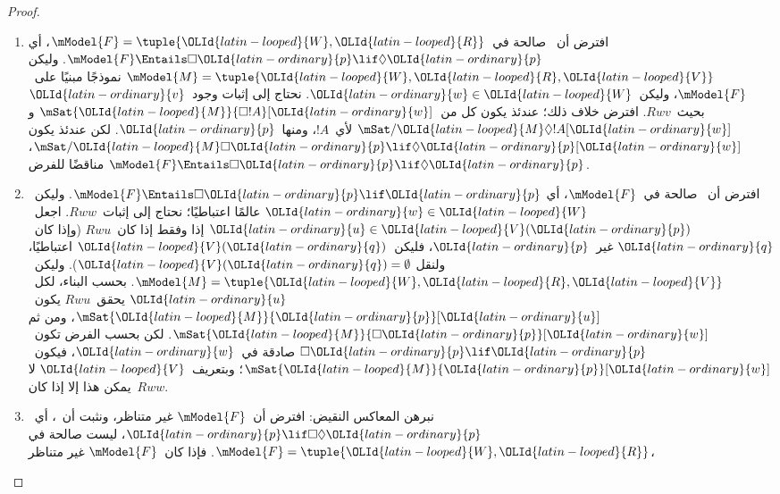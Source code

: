 \documentclass[../../../include/open-logic-section]{subfiles}
\begin{document}
\begin{proof}
  \begin{enumerate}
  \item افترض أن~ صالحة في~$\mModel{F} = \tuple{\OLId{latin-looped}{W}, \OLId{latin-looped}{R}}$، أي
    $\mModel{F} \Entails \Box \OLId{latin-ordinary}{p} \lif \Diamond \OLId{latin-ordinary}{p}$. وليكن
    $\mModel{M} = \tuple{\OLId{latin-looped}{W}, \OLId{latin-looped}{R}, \OLId{latin-looped}{V}}$ نموذجًا مبنيًا على~$\mModel{F}$،
    وليكن~$\OLId{latin-ordinary}{w} \in \OLId{latin-looped}{W}$. نحتاج إلى إثبات وجود~$\OLId{latin-ordinary}{v}$ بحيث~$Rwv$. افترض خلاف
    ذلك؛ عندئذ يكون كل من~$\mSat{\OLId{latin-looped}{M}}{\Box !A}[\OLId{latin-ordinary}{w}]$ و
    $\mSat/{\OLId{latin-looped}{M}}{\Diamond !A}[\OLId{latin-ordinary}{w}]$ لأي~$!A$، ومنها~$\OLId{latin-ordinary}{p}$. لكن عندئذ يكون
    $\mSat/{\OLId{latin-looped}{M}}{\Box \OLId{latin-ordinary}{p} \lif \Diamond \OLId{latin-ordinary}{p}}[\OLId{latin-ordinary}{w}]$، مناقضًا للفرض
    $\mModel{F} \Entails \Box \OLId{latin-ordinary}{p} \lif \Diamond \OLId{latin-ordinary}{p}$.
  \item افترض أن~ صالحة في~$\mModel{F}$، أي
    $\mModel{F} \Entails \Box \OLId{latin-ordinary}{p} \lif \OLId{latin-ordinary}{p}$. وليكن~$\OLId{latin-ordinary}{w} \in \OLId{latin-looped}{W}$ عالمًا
    اعتباطيًا؛ نحتاج إلى إثبات~$Rww$. اجعل~$\OLId{latin-ordinary}{u} \in \OLId{latin-looped}{V}(\OLId{latin-ordinary}{p})$ إذا وفقط إذا
    كان~$Rwu$ (وإذا كان~$\OLId{latin-ordinary}{q}$ غير~$\OLId{latin-ordinary}{p}$، فليكن~$\OLId{latin-looped}{V}(\OLId{latin-ordinary}{q})$ اعتباطيًا، ولنقل
    $\OLId{latin-looped}{V}(\OLId{latin-ordinary}{q}) = \emptyset$). وليكن~$\mModel{M} = \tuple{\OLId{latin-looped}{W}, \OLId{latin-looped}{R}, \OLId{latin-looped}{V}}$. بحسب
    البناء، لكل~$\OLId{latin-ordinary}{u}$ يحقق~$Rwu$ يكون~$\mSat{\OLId{latin-looped}{M}}{\OLId{latin-ordinary}{p}}[\OLId{latin-ordinary}{u}]$، ومن ثم
    $\mSat{\OLId{latin-looped}{M}}{\Box \OLId{latin-ordinary}{p}}[\OLId{latin-ordinary}{w}]$. لكن بحسب الفرض تكون~$\Box \OLId{latin-ordinary}{p} \lif \OLId{latin-ordinary}{p}$ صادقة
    في~$\OLId{latin-ordinary}{w}$، فيكون~$\mSat{\OLId{latin-looped}{M}}{\OLId{latin-ordinary}{p}}[\OLId{latin-ordinary}{w}]$؛ وبتعريف~$\OLId{latin-looped}{V}$ لا يمكن هذا إلا إذا
    كان~$Rww$.
  \item نبرهن المعاكس النقيض: افترض أن~$\mModel{F}$ غير متناظر، ونثبت
    أن~، أي~$\OLId{latin-ordinary}{p} \lif \Box\Diamond \OLId{latin-ordinary}{p}$، ليست صالحة في
    $\mModel{F}= \tuple{\OLId{latin-looped}{W}, \OLId{latin-looped}{R}}$. فإذا كان~$\mModel{F}$ غير متناظر،

\end{enumerate}
\end{proof}
\end{document}
